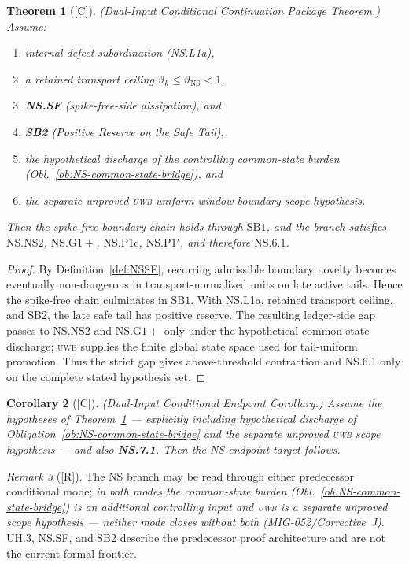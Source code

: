 \documentclass[12pt,oneside]{amsbook}
\theoremstyle{plain}
\newtheorem{theorem}{Theorem}[section]
\newtheorem{corollary}[theorem]{Corollary}
\theoremstyle{definition}
\theoremstyle{remark}
\newtheorem{remark}[theorem]{Remark}
\newcommand{\status}[1]{\textup{[#1]}}
\begin{document}
\begin{theorem}[\status{C}]\label{thm:NSDI2}
\textup{(Dual-Input Conditional Continuation Package Theorem.)}
Assume:
\begin{enumerate}[label=\textup{(\arabic*)}]
 \item internal defect subordination (NS.L1a),
 \item a retained transport ceiling $\vartheta_k \le \vartheta_{\mathrm{NS}} < 1$,
 \item \textbf{NS.SF} (spike-free-side dissipation), and
 \item \textbf{SB2} (Positive Reserve on the Safe Tail),
 \item the hypothetical discharge of the controlling common-state
 burden (Obl.~\ref{ob:NS-common-state-bridge}), and
 \item the separate unproved \textsc{uwb} uniform window-boundary
 scope hypothesis.
\end{enumerate}
Then the spike-free boundary chain holds through $\mathrm{SB1}$, and the branch satisfies $\mathrm{NS.NS2}$, $\mathrm{NS.G1+}$, $\mathrm{NS.P1c}$, $\mathrm{NS.P1'}$, and therefore $\mathrm{NS.6.1}$.
\end{theorem}

\begin{proof}
By Definition~\ref{def:NSSF}, recurring admissible boundary novelty
becomes eventually non-dangerous in transport-normalized units on late
active tails. Hence the spike-free chain culminates in
$\mathrm{SB1}$. With NS.L1a, retained transport ceiling, and SB2, the
late safe tail has positive reserve. The resulting ledger-side gap
passes to $\mathrm{NS.NS2}$ and $\mathrm{NS.G1+}$ only under the
hypothetical common-state discharge; \textsc{uwb} supplies the finite
global state space used for tail-uniform promotion. Thus the strict
gap gives above-threshold contraction and NS.6.1 only on the complete
stated hypothesis set. \qedhere
\end{proof}

\begin{corollary}[\status{C}]\label{cor:NSDI3}
\textup{(Dual-Input Conditional Endpoint Corollary.)}
Assume the hypotheses of Theorem~\ref{thm:NSDI2} --- explicitly
including hypothetical discharge of
Obligation~\ref{ob:NS-common-state-bridge} and the separate unproved
\textsc{uwb} scope hypothesis --- and also \textbf{NS.7.1}. Then the
NS endpoint target follows.
\end{corollary}

\begin{remark}[\status{R}]\label{rmk:NSMode1}
The NS branch may be read through either predecessor conditional mode;
\emph{in both modes the common-state burden
(Obl.~\ref{ob:NS-common-state-bridge}) is an additional controlling
input and \textsc{uwb} is a separate unproved scope hypothesis ---
neither mode closes without both (MIG-052/Corrective~J)}. UH.3, NS.SF,
and SB2 describe the predecessor proof architecture and are not the
current formal frontier.
\end{remark}
\end{document}
